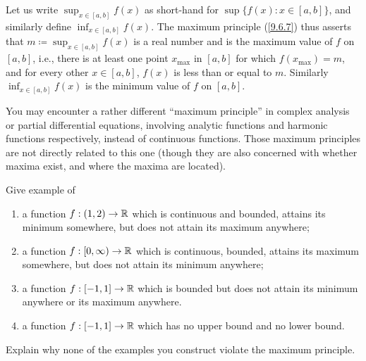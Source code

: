 \begin{note}
  Let us write \(\sup_{x \in [a, b]} f(x)\) as short-hand for \(\sup\{f(x) : x \in [a, b]\}\), and similarly define \(\inf_{x \in [a, b]} f(x)\).
  The maximum principle (\cref{9.6.7}) thus asserts that \(m \coloneqq \sup_{x \in [a, b]} f(x)\) is a real number and is the maximum value of \(f\) on \([a, b]\), i.e., there is at least one point \(x_{\max}\) in \([a, b]\) for which \(f(x_{\max}) = m\), and for every other \(x \in [a, b]\), \(f(x)\) is less than or equal to \(m\).
  Similarly \(\inf_{x \in [a, b]} f(x)\) is the minimum value of \(f\) on \([a, b]\).
\end{note}

\begin{rmk}\label{9.6.9}
  You may encounter a rather different ``maximum principle'' in complex analysis or partial differential equations, involving analytic functions and harmonic functions respectively, instead of continuous functions.
  Those maximum principles are not directly related to this one
  (though they are also concerned with whether maxima exist, and where the maxima are located).
\end{rmk}

\exercisesection

\begin{ex}\label{ex:9.6.1}
  Give example of
  \begin{enumerate}
    \item a function \(f : (1, 2) \to \mathbb{R}\) which is continuous and bounded, attains its minimum somewhere, but does not attain its maximum anywhere;
    \item a function \(f : [0, \infty) \to \mathbb{R}\) which is continuous, bounded, attains its maximum somewhere, but does not attain its minimum anywhere;
    \item a function \(f : [-1, 1] \to \mathbb{R}\) which is bounded but does not attain its minimum anywhere or its maximum anywhere.
    \item a function \(f : [-1, 1] \to \mathbb{R}\) which has no upper bound and no lower bound.
  \end{enumerate}
  Explain why none of the examples you construct violate the maximum principle.
\end{ex}

